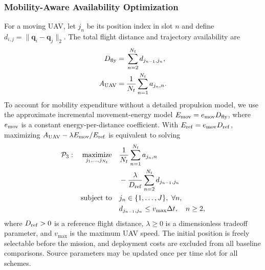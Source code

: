 \documentclass[conference,a4paper]{IEEEtran}
\begin{document}
\subsubsection{Mobility-Aware Availability Optimization}
For a moving UAV, let $j_n$ be its position index in slot
$n$ and define $d_{i,j}=\|\mathbf q_i-\mathbf q_j\|_2$.
The total flight distance and trajectory availability are
\begin{align}
D_{\rm fly}
={}&\sum_{n=2}^{N_t}d_{j_{n-1},j_n},
\label{eq:availability_flight_distance}
\\
A_{\rm UAV}
={}&\frac{1}{N_t}\sum_{n=1}^{N_t}a_{j_n,n}.
\label{eq:availability_trajectory}
\end{align}
To account for mobility expenditure without a detailed
propulsion model, we use the approximate incremental
movement-energy model $E_{\rm mov}=e_{\rm mov}D_{\rm fly}$,
where $e_{\rm mov}$ is a constant energy-per-distance
coefficient. With $E_{\rm ref}=e_{\rm mov}D_{\rm ref}$,
maximizing $A_{\rm UAV}-\lambda E_{\rm mov}/E_{\rm ref}$
is equivalent to solving
\begin{align}
\mathcal P_3:\quad
\underset{j_1,\ldots,j_{N_t}}{\operatorname{maximize}}
\quad&\frac{1}{N_t}\sum_{n=1}^{N_t}a_{j_n,n}
\nonumber\\
&-\frac{\lambda}{D_{\rm ref}}
\sum_{n=2}^{N_t}d_{j_{n-1},j_n}
\label{eq:availability_moving_opt}
\\
\text{subject to}\quad&j_n\in\{1,\ldots,J\},\ \forall n,
\label{eq:availability_grid_constraint}
\\
&d_{j_{n-1},j_n}\leq v_{\max}\Delta t,
\quad n\geq2,
\label{eq:availability_speed_constraint}
\end{align}
where $D_{\rm ref}>0$ is a reference flight distance,
$\lambda\geq0$ is a dimensionless tradeoff parameter, and
$v_{\max}$ is the maximum UAV speed. The initial position
is freely selectable before the mission, and deployment
costs are excluded from all baseline comparisons. Source
parameters may be updated once per time slot for all schemes.
\end{document}
